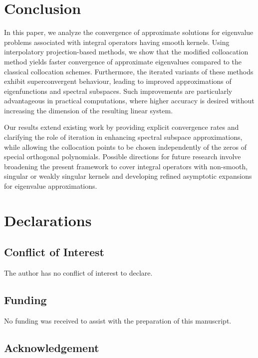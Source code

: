 \documentclass[]{interact}
\theoremstyle{plain}%
\theoremstyle{definition}
\theoremstyle{remark}
\begin{document}
\section{Conclusion}

In this paper, we analyze the convergence of approximate solutions for eigenvalue problems associated with integral operators having smooth kernels. Using interpolatory projection-based methods, we show that the modified colloacation method yields faster convergence of approximate eigenvalues compared to the classical collocation schemes. 
Furthermore, the iterated variants of these methods exhibit superconvergent behaviour, leading to improved approximations of eigenfunctions and spectral subspaces. 
Such improvements are particularly advantageous in practical computations, where higher accuracy is desired without increasing the dimension of the resulting linear system.

Our results extend existing work by providing explicit convergence rates and clarifying the role of iteration in enhancing spectral subspace approximations, while allowing the collocation points to be chosen independently of the zeros of special orthogonal polynomials. Possible directions for future research involve broadening the present framework to cover integral operators with non-smooth, singular or weakly singular kernels and developing refined asymptotic expansions for eigenvalue approximations.






\section*{Declarations}

\subsection*{Conflict of Interest}
The author has no conflict of interest to declare.

\subsection*{Funding}
No funding was received to assist with the preparation of this manuscript.

\subsection*{Acknowledgement}
\end{document}
